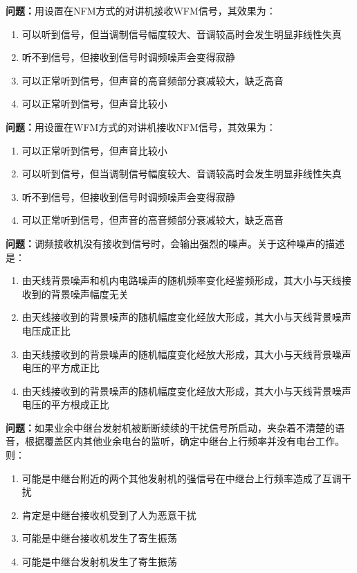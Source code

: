 \documentclass{ctexbook}
\begin{document}
\textbf{问题：}用设置在NFM方式的对讲机接收WFM信号，其效果为：
\begin{enumerate}[label=\Alph*), leftmargin=3em]
\item 可以听到信号，但当调制信号幅度较大、音调较高时会发生明显非线性失真
\item 听不到信号，但接收到信号时调频噪声会变得寂静
\item 可以正常听到信号，但声音的高音频部分衰减较大，缺乏高音
\item 可以正常听到信号，但声音比较小
\end{enumerate}

\textbf{问题：}用设置在WFM方式的对讲机接收NFM信号，其效果为：
\begin{enumerate}[label=\Alph*), leftmargin=3em]
\item 可以正常听到信号，但声音比较小
\item 可以听到信号，但当调制信号幅度较大、音调较高时会发生明显非线性失真
\item 听不到信号，但接收到信号时调频噪声会变得寂静
\item 可以正常听到信号，但声音的高音频部分衰减较大，缺乏高音
\end{enumerate}

\textbf{问题：}调频接收机没有接收到信号时，会输出强烈的噪声。关于这种噪声的描述是：
\begin{enumerate}[label=\Alph*), leftmargin=3em]
\item 由天线背景噪声和机内电路噪声的随机频率变化经鉴频形成，其大小与天线接收到的背景噪声幅度无关
\item 由天线接收到的背景噪声的随机幅度变化经放大形成，其大小与天线背景噪声电压成正比
\item 由天线接收到的背景噪声的随机幅度变化经放大形成，其大小与天线背景噪声电压的平方成正比
\item 由天线接收到的背景噪声的随机幅度变化经放大形成，其大小与天线背景噪声电压的平方根成正比
\end{enumerate}

\textbf{问题：}如果业余中继台发射机被断断续续的干扰信号所启动，夹杂着不清楚的语音，根据覆盖区内其他业余电台的监听，确定中继台上行频率并没有电台工作。则：
\begin{enumerate}[label=\Alph*), leftmargin=3em]
\item 可能是中继台附近的两个其他发射机的强信号在中继台上行频率造成了互调干扰
\item 肯定是中继台接收机受到了人为恶意干扰
\item 可能是中继台接收机发生了寄生振荡
\item 可能是中继台发射机发生了寄生振荡
\end{enumerate}
\end{document}
